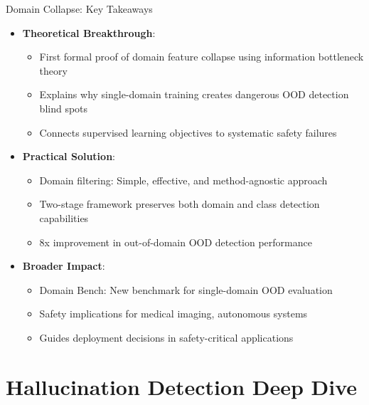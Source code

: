 \documentclass[aspectratio=169]{beamer}
\newcommand{\sectionpubinfo}{}
\begin{document}
\begin{frame}{Domain Collapse: Key Takeaways}
\begin{itemize}
    \item \textbf{Theoretical Breakthrough}:
    \begin{itemize}
        \item First formal proof of domain feature collapse using information bottleneck theory
        \item Explains why single-domain training creates dangerous OOD detection blind spots
        \item Connects supervised learning objectives to systematic safety failures
    \end{itemize}
    \item \textbf{Practical Solution}:
    \begin{itemize}
        \item Domain filtering: Simple, effective, and method-agnostic approach
        \item Two-stage framework preserves both domain and class detection capabilities
        \item 8x improvement in out-of-domain OOD detection performance
    \end{itemize}
    \item \textbf{Broader Impact}:
    \begin{itemize}
        \item Domain Bench: New benchmark for single-domain OOD evaluation
        \item Safety implications for medical imaging, autonomous systems
        \item Guides deployment decisions in safety-critical applications
    \end{itemize}
\end{itemize}
\end{frame}

\renewcommand{\sectionpubinfo}{\hspace{1ex}(Work In Progress)}
\section{Hallucination Detection Deep Dive}
\end{document}
